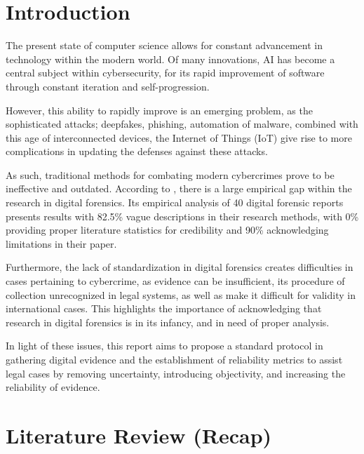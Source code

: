 \documentclass[a4paper]{report}
\begin{document}
\begin{justify}


\chapter{Introduction}

The present state of computer science allows for constant advancement in technology within the modern world. Of many innovations, AI has become a central subject within cybersecurity, for its rapid improvement of software through constant iteration and self-progression. 

However, this ability to rapidly improve is an emerging problem, as the sophisticated attacks; deepfakes, phishing, automation of malware, combined with this age of interconnected devices, the Internet of Things (IoT) give rise to more complications in updating the defenses against these attacks. 

As such, traditional methods for combating modern cybercrimes prove to be ineffective and outdated. According to \cite{sharma2024digital}, there is a large empirical gap within the research in digital forensics. Its empirical analysis of 40 digital forensic reports presents results with 82.5\% vague descriptions in their research methods, with 0\% providing proper literature statistics for credibility and 90\% acknowledging limitations in their paper. 

Furthermore, the lack of standardization in digital forensics creates difficulties in cases pertaining to cybercrime, as evidence can be insufficient, its procedure of collection unrecognized in legal systems, as well as make it difficult for validity in international cases. 
This highlights the importance of acknowledging that research in digital forensics is in its infancy, and in need of proper analysis.  

In light of these issues, this report aims to propose a standard protocol in gathering digital evidence and the establishment of reliability metrics to assist legal cases by removing uncertainty, introducing objectivity, and increasing the reliability of evidence. 



\chapter{Literature Review (Recap)}


\end{justify}
\end{document}
